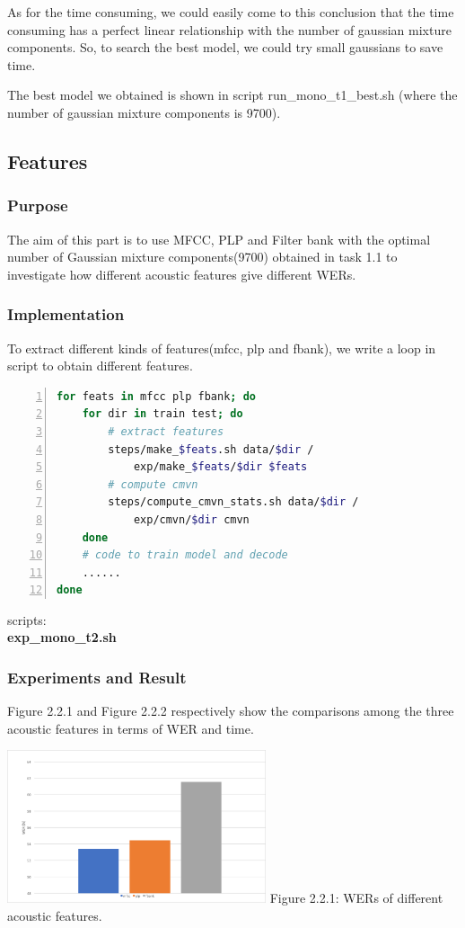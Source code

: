 \documentclass[]{article}
\begin{document}
\begin{multicols*}{2}
As for the time consuming, we could easily come to this conclusion that the time consuming has a perfect linear relationship with the number of gaussian mixture components. So, to search the best model, we could try small gaussians to save time.

The best model we obtained is shown in script run\_mono\_t1\_best.sh (where the number of gaussian mixture components is 9700).

\subsection{Features}
\subsubsection{Purpose}
The aim of this part is to use MFCC, PLP and Filter bank with the optimal number of Gaussian mixture components(9700) obtained in task 1.1 to investigate how different acoustic features give different WERs. 

\subsubsection{Implementation}
To extract different kinds of features(mfcc, plp and fbank), we write a loop in script to obtain different features.

\begin{lstlisting}[language=sh,showstringspaces=false,numbers=left,tabsize=4, xleftmargin=\parindent, frame=single, basicstyle=\tiny] 
for feats in mfcc plp fbank; do
	for dir in train test; do
		# extract features
		steps/make_$feats.sh data/$dir /
			exp/make_$feats/$dir $feats
		# compute cmvn
		steps/compute_cmvn_stats.sh data/$dir /
			exp/cmvn/$dir cmvn
	done	
	# code to train model and decode
	......
done

\end{lstlisting}

scripts: \textbf{\\ \indent exp\_mono\_t2.sh}

\subsubsection{Experiments and Result}
Figure 2.2.1 and Figure 2.2.2 respectively show the comparisons among the three acoustic features in terms of WER and time.

\begin{center}
\includegraphics[width=3in]{Picture2.png} 
Figure 2.2.1: WERs of different acoustic features.
\end{center}


\end{multicols*}
\end{document}
